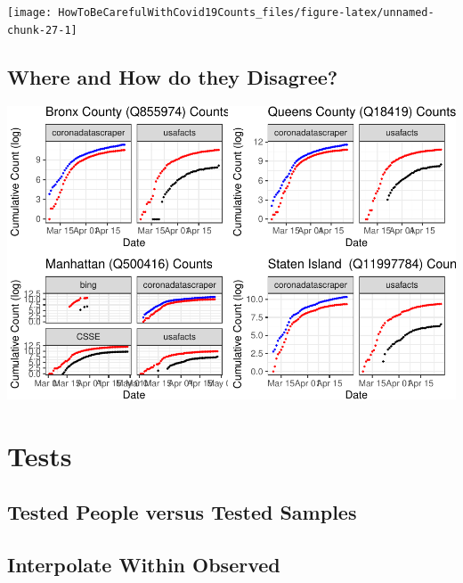 \documentclass[
]{book}
\begin{document}
\begin{center}\texttt{[image: HowToBeCarefulWithCovid19Counts\_files/figure-latex/unnamed-chunk-27-1]} \end{center}

\hypertarget{where-and-how-do-they-disagree}{%
\section{Where and How do they Disagree?}\label{where-and-how-do-they-disagree}}

\begin{center}\includegraphics[width=1\linewidth]{HowToBeCarefulWithCovid19Counts_files/figure-latex/unnamed-chunk-29-1} \end{center}

\hypertarget{htmlwidget-53fed79daa8d98808eda}{}

\hypertarget{htmlwidget-3bd029832caec1d27062}{}

\hypertarget{tests}{%
\chapter{Tests}\label{tests}}

\hypertarget{tested-people-versus-tested-samples}{%
\section{Tested People versus Tested Samples}\label{tested-people-versus-tested-samples}}

\hypertarget{interpolate-within-observed}{%
\section{Interpolate Within Observed}\label{interpolate-within-observed}}
\end{document}

